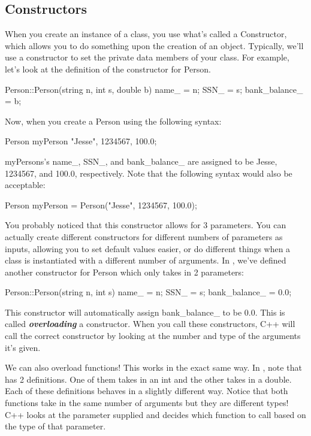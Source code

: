 \documentclass{tufte-handout}
\begin{document}
\subsection{Constructors}
When you create an instance of a class, you use what's called a Constructor, which allows you to do something upon the creation of an object.
Typically, we'll use a constructor to set the private data members of your class.
For example, let's look at the definition of the constructor for Person.
\begin{Code}
Person::Person(string n, int s, double b) 
{
    name_ = n;
    SSN_ = s;
    bank_balance_ = b;
}
\end{Code}
Now, when you create a Person using the following syntax:
\begin{Code}
    Person myPerson {"Jesse", 1234567, 100.0};
\end{Code}

myPersons's name\_, SSN\_, and bank\_balance\_ are assigned to be Jesse, 1234567, and 100.0, respectively. 
Note that the following syntax would also be acceptable:
\begin{Code}
    Person myPerson = Person("Jesse", 1234567, 100.0);
\end{Code}

You probably noticed that this constructor allows for 3 parameters.
You can actually create different constructors for different numbers of parameters as inputs, allowing you to set default values easier, or do different things when a class is instantiated with a different number of arguments.
In , we've defined another constructor for Person which only takes in 2 parameters:
\begin{Code}
Person::Person(string n, int s) 
{
    name_ = n;
    SSN_ = s;
    bank_balance_ = 0.0;
}
\end{Code}
This constructor will automatically assign bank\_balance\_ to be 0.0.
This is called \textit{\textbf{overloading}} a constructor.
When you call these constructors, C++ will call the correct constructor by looking at the number and type of the arguments it's given.

We can also overload functions! This works in the exact same way.
In , note that  has 2 definitions. 
One of them takes in an int and the other takes in a double.
Each of these definitions behaves in a slightly different way.
Notice that both functions take in the same number of arguments but they are different types!
C++ looks at the parameter supplied and decides which function to call based on the type of that parameter.
\end{document}
